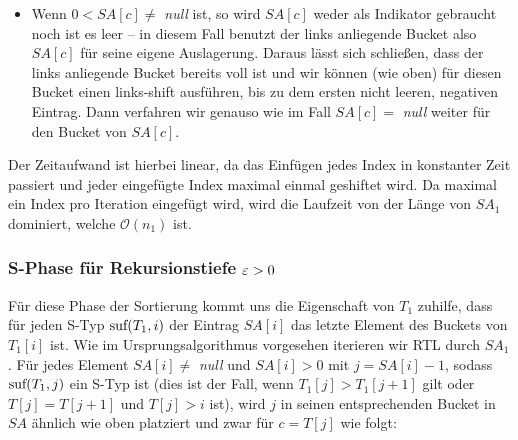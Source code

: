 \begin{itemize}
\item Wenn $ 0 < SA[c] \neq$ \textit{null} ist, so wird $SA[c]$ weder als Indikator gebraucht noch ist es leer -- in diesem Fall benutzt der links anliegende Bucket also $SA[c]$ für seine eigene Auslagerung. Daraus lässt sich schließen, dass der links anliegende Bucket bereits voll ist und wir können (wie oben) für diesen Bucket einen links-shift ausführen, bis zu dem ersten nicht leeren, negativen Eintrag. Dann verfahren wir genauso wie im Fall $SA[c] = $ \textit{null} weiter für den Bucket von $SA[c]$.
\end{itemize}

Der Zeitaufwand ist hierbei linear, da das Einfügen jedes Index in konstanter Zeit passiert und jeder eingefügte Index maximal einmal geshiftet wird. Da maximal ein Index pro Iteration eingefügt wird, wird die Laufzeit von der Länge von $SA_1$ dominiert, welche $\mathcal O(n_1)$ ist.

\subsubsection{ S-Phase für Rekursionstiefe $\varepsilon > 0$}

Für diese Phase der Sortierung kommt uns die Eigenschaft von $T_1$ zuhilfe, dass für jeden S-Typ $\text{suf}(T_1, i)$ der Eintrag $SA[i]$ das letzte Element des Buckets von $T_1[i]$ ist. Wie im Ursprungsalgorithmus vorgesehen iterieren wir RTL durch $SA_1$. Für jedes Element $SA[i] \neq $ \textit{null} und $SA[i] > 0$ mit $j = SA[i] -1$, sodass $\text{suf}(T_1,j)$ ein S-Typ ist (dies ist der Fall, wenn $T_1[j] > T_1[j+1]$ gilt oder $T[j] = T[j+1]$ und $T[j] > i$ ist), wird $j$ in seinen entsprechenden Bucket in $SA$ ähnlich wie oben platziert und zwar für $c = T[j]$ wie folgt:

